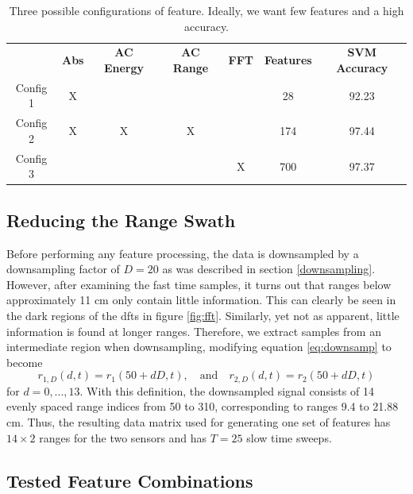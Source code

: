 \begin{table}
\begin{center}
  \begin{tabular}{|c|cccccc|}
\hline
    \rowcolor{gray!150}
		  & \color{white}\textbf{Abs} & \color{white}\textbf{AC Energy} & \color{white}\textbf{AC Range} & \color{white}\textbf{FFT} & \color{white}\textbf{Features} & \color{white}\textbf{SVM Accuracy} \\
	  Config 1 & X &   &   &   & 28  & 92.23 \\
	  Config 2 & X & X & X & & 174 & 97.44 \\
	  Config 3 & & & & X & 700 & 97.37 \\
\hline
  \end{tabular}
\end{center}
\caption{Three possible configurations of feature. Ideally, we want few features and a high accuracy.}
\label{tab:feat}
\end{table}



\subsection{Reducing the Range Swath}

Before performing any feature processing, the data is downsampled by a downsampling factor of $D=20$ as was described in section \ref{downsampling}. However, after examining the fast time samples, it turns out that ranges below approximately 11 cm only contain little information. This can clearly be seen in the dark regions of the \gls{dft}s in figure \ref{fig:fft}. Similarly, yet not as apparent, little information is found at longer ranges. Therefore, we extract samples from an intermediate region when downsampling, modifying equation \eqref{eq:downsamp} to become
\begin{equation}
	r_{1,D}(d, t) = r_{1}(50+dD,t), 
	\quad \text{and} \quad r_{2,D}(d,t) = r_{2}(50+dD,t)
\end{equation}
for $d=0,...,13$. With this definition, the downsampled signal consists of 14 evenly spaced range indices from 50 to 310, corresponding to ranges 9.4 to 21.88 cm. Thus, the resulting data matrix used for generating one set of features has $14\times 2$ ranges for the two sensors and has $T=25$ slow time sweeps. 

\subsection{Tested Feature Combinations}

